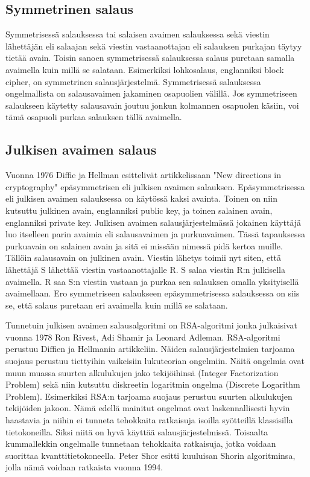 \subsection{Symmetrinen salaus}
 Symmetrisessä salauksessa tai salaisen avaimen salauksessa sekä viestin lähettäjän eli salaajan sekä viestin vastaanottajan eli salauksen purkajan täytyy tietää avain. Toisin sanoen symmetrisessä salauksessa salaus puretaan samalla avaimella kuin millä se salataan. Esimerkiksi lohkosalaus, englanniksi block cipher, on symmetrinen salausjärjestelmä. Symmetrisessä salauksessa ongelmallista on salausavaimen jakaminen osapuolien välillä. Jos symmetriseen salaukseen käytetty salausavain joutuu jonkun kolmannen osapuolen käsiin, voi tämä osapuoli purkaa salauksen tällä avaimella.
 
 \subsection{Julkisen avaimen salaus}
 Vuonna 1976 Diffie ja Hellman esittelivät artikkelissaan "New directions in cryptography" epäsymmetrisen eli julkisen avaimen salauksen. Epäsymmetrisessa eli julkisen avaimen salauksessa on käytössä kaksi avainta. Toinen on niin kutsuttu julkinen avain, englanniksi public key, ja toinen salainen avain, englanniksi private key. Julkisen avaimen salausjärjestelmässä jokainen käyttäjä luo itselleen parin avaimia eli salausavaimen ja purkuavaimen. Tässä tapauksessa purkuavain on salainen avain ja sitä ei missään nimessä pidä kertoa muille. Tällöin salausavain on julkinen avain. Viestin lähetys toimii nyt siten, että lähettäjä S lähettää viestin vastaanottajalle R. S salaa viestin R:n julkisella avaimella. R saa S:n viestin vastaan ja purkaa sen salauksen omalla yksityisellä avaimellaan. Ero symmetriseen salaukseen epäsymmetrisessa salauksessa on siis se, että salaus puretaan eri avaimella kuin millä se salataan.
 
 Tunnetuin julkisen avaimen salausalgoritmi on RSA-algoritmi jonka julkaisivat vuonna 1978 Ron Rivest, Adi Shamir ja Leonard Adleman. RSA-algoritmi perustuu Diffien ja Hellmanin artikkeliin. Näiden salausjärjestelmien tarjoama suojaus perustuu tiettyihin vaikeisiin lukuteorian ongelmiin. Näitä ongelmia ovat muun muassa suurten alkulukujen jako tekijöihinsä (Integer Factorization Problem) sekä niin kutsuttu diskreetin logaritmin ongelma (Discrete Logarithm Problem). Esimerkiksi RSA:n tarjoama suojaus perustuu suurten alkulukujen tekijöiden jakoon. Nämä edellä mainitut ongelmat ovat laskennallisesti hyvin haastavia ja niihin ei tunneta tehokkaita ratkaisuja isoilla syötteillä klassisilla tietokoneilla. Siksi niitä on hyvä käyttää salausjärjestelmissä. Toisaalta kummallekkin ongelmalle tunnetaan tehokkaita ratkaisuja, jotka voidaan suorittaa kvanttitietokoneella. Peter Shor esitti kuuluisan Shorin algoritminsa, jolla nämä voidaan ratkaista vuonna 1994.
 
